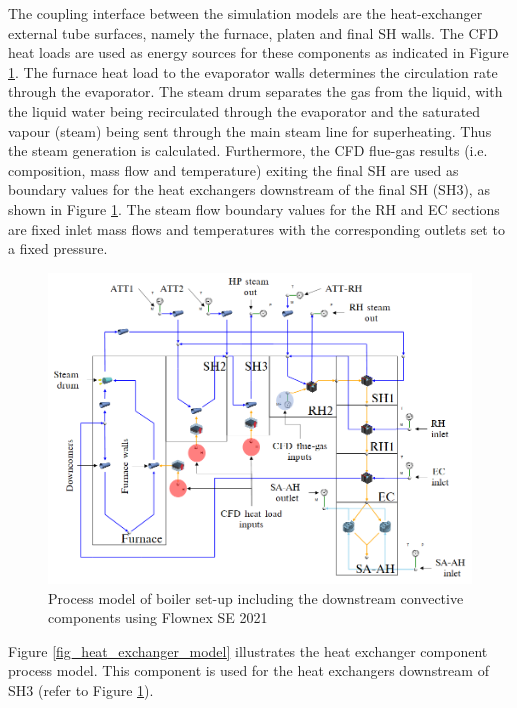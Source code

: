 \documentclass[review]{elsarticle}
\begin{document}
The coupling interface between the simulation models are the heat-exchanger external tube surfaces, namely the furnace, platen and final SH walls. The CFD heat loads are used as energy sources for these components as indicated in Figure \ref{fig_flownex}. The furnace heat load to the evaporator walls determines the circulation rate through the evaporator. The steam drum separates the gas from the liquid, with the liquid water being recirculated through the evaporator and the saturated vapour (steam) being sent through the main steam line for superheating. Thus the steam generation is calculated. Furthermore, the CFD flue-gas results (i.e. composition, mass flow and temperature) exiting the final SH are used as boundary values for the heat exchangers downstream of the final SH (SH3), as shown in Figure \ref{fig_flownex}. The steam flow boundary values for the RH and EC sections are fixed inlet mass flows and temperatures with the corresponding outlets set to a fixed pressure.
\begin{figure}[h!]
\centering
\includegraphics[scale=0.5]{FLOWNEX_SETUP}
\caption{Process model of boiler set-up including the downstream convective components using Flownex SE 2021}
\label{fig_flownex}
\end{figure}

Figure \ref{fig_heat_exchanger_model} illustrates the heat exchanger component process model. This component is used for the heat exchangers downstream of SH3 (refer to Figure \ref{fig_flownex}).\\
\end{document}
